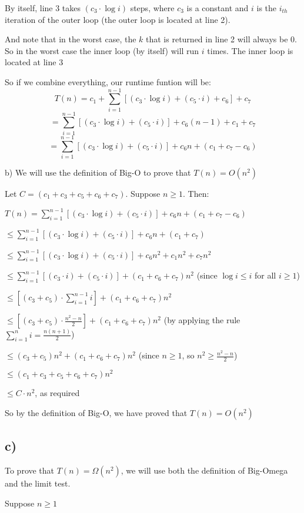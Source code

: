 \documentclass{article}
\begin{document}
By itself, line 3 takes $(c_3 \cdot \log i)$ steps, where $c_3$ is a constant and $i$ is the $i_{th}$ iteration of the outer loop (the outer loop is located at line 2).

And note that in the worst case, the $k$ that is returned in line 2 will always be $0$. So in the worst case the inner loop (by itself) will run $i$ times. The inner loop is located at line 3

So if we combine everything, our runtime funtion will be:
\[ T(n) = c_1 + \sum_{i=1}^{n-1} [(c_3 \cdot \log i) + (c_5 \cdot i) + c_6] + c_7 \]
\[ = \sum_{i=1}^{n-1} [(c_3 \cdot \log i) + (c_5 \cdot i)]  + c_6(n-1) + c_1 + c_7 \]
\[ = \sum_{i=1}^{n-1} [(c_3 \cdot \log i) + (c_5 \cdot i)] + c_6n + (c_1 + c_7 - c_6) \]


b) We will use the definition of Big-O to prove that $T(n) = O(n^2)$

Let $C = (c_1+c_3+c_5+c_6+c_7)$. Suppose $n \ge 1$. Then:

$T(n) = \sum_{i=1}^{n-1} [(c_3 \cdot \log i) + (c_5 \cdot i)] + c_6n + (c_1 + c_7 - c_6) $

$\leq \sum_{i=1}^{n-1} [(c_3 \cdot \log i) + (c_5 \cdot i)] + c_6n + (c_1 + c_7)$

$\leq \sum_{i=1}^{n-1} [(c_3 \cdot \log i) + (c_5 \cdot i)] + c_6n^2 + c_1n^2 + c_7n^2$

$\leq \sum_{i=1}^{n-1} [(c_3 \cdot i) + (c_5 \cdot i)] + (c_1+c_6+c_7)n^2$ \;\;\;(since $\log i \leq i$ for all $i \geq 1$)

$\leq [(c_3 + c_5) \cdot \sum_{i=1}^{n-1} i] + (c_1+c_6+c_7)n^2 $  

$\leq [(c_3 + c_5) \cdot \frac{n^2-n}{2}] + (c_1+c_6+c_7)n^2 $ \; (by applying the rule $\sum_{i=1}^{n} i = \frac{n(n+1)}{2}$)

$\leq (c_3 + c_5)n^2 + (c_1+c_6+c_7)n^2 $   \;\;\;  (since $n \geq 1$, so $n^2 \geq \frac{n^2-n}{2}$)

$\leq (c_1+c_3+c_5+c_6+c_7)n^2$

$\leq C \cdot n^2$,\; as required

So by the definition of Big-O, we have proved that $T(n) = O(n^2)$


\subsection*{c)}
To prove that $T(n) = \Omega(n^2)$, we will use both the definition of Big-Omega and the limit test.

Suppose $n \geq 1$
\end{document}
